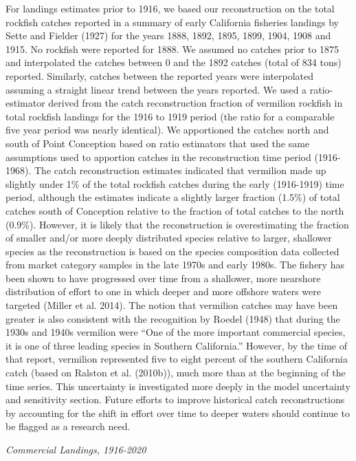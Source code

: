 \documentclass[
  english,
  a4paper,
]{article}
\begin{document}
For landings estimates prior to 1916, we based our reconstruction on the total
rockfish catches reported in a summary of early California fisheries landings by
Sette and Fielder (1927) for the years 1888, 1892, 1895, 1899, 1904, 1908
and 1915. No rockfish were reported for 1888. We assumed no catches prior to 1875
and interpolated the catches between 0 and the 1892 catches (total of 834
tons) reported. Similarly, catches between the reported years were interpolated
assuming a straight linear trend between the years reported. We used a
ratio-estimator derived from the catch reconstruction fraction of vermilion
rockfish in total rockfish landings for the 1916 to 1919 period (the ratio for
a comparable five year period was nearly identical). We apportioned the catches
north and south of Point Conception based on ratio estimators that used the same
assumptions used to apportion catches in the reconstruction time period (1916-1968).
The catch reconstruction estimates indicated that vermilion made up slightly under
1\% of the total rockfish catches during the early (1916-1919) time period, although
the estimates indicate a slightly larger fraction (1.5\%) of total catches south of
Conception relative to the fraction of total catches to the north (0.9\%). However,
it is likely that the reconstruction is overestimating the fraction of smaller and/or
more deeply distributed species relative to larger, shallower species as the
reconstruction is based on the species composition data collected from market
category samples in the late 1970s and early 1980s. The fishery has been shown
to have progressed over time from a shallower, more nearshore distribution of
effort to one in which deeper and more offshore waters were targeted (Miller et al. 2014).
The notion that vermilion catches may have been greater is also consistent with
the recognition by Roedel (1948) that during the 1930s and 1940s vermilion
were ``One of the more important commercial species, it is one of three leading
species in Southern California.'' However, by the time of that report, vermilion
represented five to eight percent of the southern California catch (based on
Ralston et al. (2010b)), much more than at the beginning of the time
series. This uncertainty is investigated more deeply in the model uncertainty and sensitivity section. Future efforts to improve historical catch reconstructions by accounting
for the shift in effort over time to deeper waters should continue to be flagged
as a research need.

\emph{Commercial Landings, 1916-2020}
\end{document}
